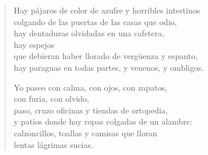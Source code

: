 \documentclass[12pt]{article}
\begin{document}
\begin{verse}
Hay pájaros de color de azufre y horribles intestinos\\
colgando de las puertas de las casas que odio,\\
hay dentaduras olvidadas en una cafetera,\\
hay espejos\\
que debieran haber llorado de vergüenza y espanto,\\
hay paraguas en todas partes, y venenos, y ombligos.  

Yo paseo con calma, con ojos, con zapatos,\\
con furia, con olvido,\\
paso, cruzo oficinas y tiendas de ortopedia,\\
y patios donde hay ropas colgadas de un alambre:\\
calzoncillos, toallas y camisas que lloran\\
lentas lágrimas sucias.  

\end{verse}
\end{document}
